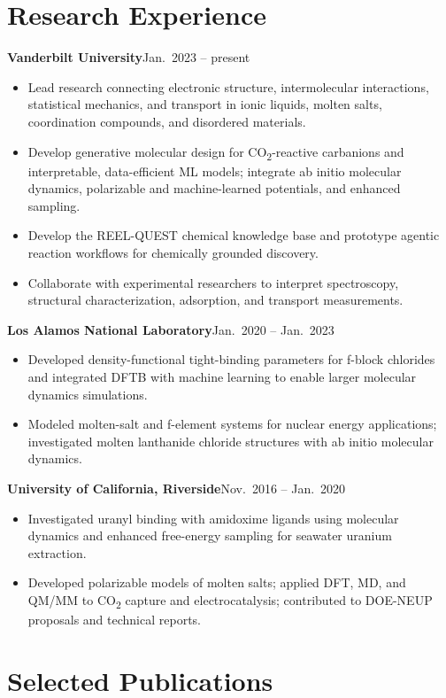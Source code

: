 \documentclass[10pt]{article}
\newcommand{\entry}[3]{%
  \textbf{#1}\hfill{\color{muted}#2}\par
  #3\par\vspace{3pt}}
\newcommand{\co}{CO\textsubscript{2}}
\begin{document}
\section{Research Experience}

\entry{Vanderbilt University}{Jan.\ 2023 -- present}{%
\begin{itemize}
  \item Lead research connecting electronic structure, intermolecular interactions, statistical
    mechanics, and transport in ionic liquids, molten salts, coordination compounds, and
    disordered materials.
  \item Develop generative molecular design for \co-reactive carbanions and interpretable,
    data-efficient ML models; integrate ab initio molecular dynamics, polarizable and
    machine-learned potentials, and enhanced sampling.
  \item Develop the REEL-QUEST chemical knowledge base and prototype agentic reaction workflows for
    chemically grounded discovery.
  \item Collaborate with experimental researchers to interpret spectroscopy, structural
    characterization, adsorption, and transport measurements.
\end{itemize}}
\entry{Los Alamos National Laboratory}{Jan.\ 2020 -- Jan.\ 2023}{%
\begin{itemize}
  \item Developed density-functional tight-binding parameters for f-block chlorides and integrated
    DFTB with machine learning to enable larger molecular dynamics simulations.
  \item Modeled molten-salt and f-element systems for nuclear energy applications; investigated
    molten lanthanide chloride structures with ab initio molecular dynamics.
\end{itemize}}
\entry{University of California, Riverside}{Nov.\ 2016 -- Jan.\ 2020}{%
\begin{itemize}
  \item Investigated uranyl binding with amidoxime ligands using molecular dynamics and enhanced
    free-energy sampling for seawater uranium extraction.
  \item Developed polarizable models of molten salts; applied DFT, MD, and QM/MM to \co{} capture
    and electrocatalysis; contributed to DOE-NEUP proposals and technical reports.
\end{itemize}}

\section{Selected Publications}
\end{document}
